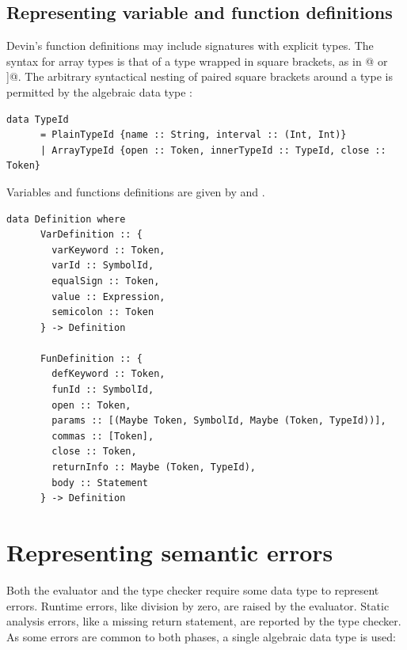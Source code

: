 \documentclass[UdineBachThesis,american,11pt]{PhdThesis}
\begin{document}
  \subsection{Representing variable and function definitions}

  Devin's function definitions may include signatures with explicit types. The
  syntax for array types is that of a type wrapped in square brackets, as in
  \lstinline@[Int]@ or \lstinline@[[Float]]@. The arbitrary syntactical nesting
  of paired square brackets around a type is permitted by the algebraic data
  type \lstinline@TypeId@:

  \begin{lstlisting}[gobble=4,basicstyle=\ttfamily\small]
    data TypeId
      = PlainTypeId {name :: String, interval :: (Int, Int)}
      | ArrayTypeId {open :: Token, innerTypeId :: TypeId, close :: Token}
  \end{lstlisting}

  Variables and functions definitions are given by \lstinline@VarDefinition@ and
  \lstinline@FunDefinition@.

  \begin{lstlisting}[gobble=4,basicstyle=\ttfamily\small]
    data Definition where
      VarDefinition :: {
        varKeyword :: Token,
        varId :: SymbolId,
        equalSign :: Token,
        value :: Expression,
        semicolon :: Token
      } -> Definition

      FunDefinition :: {
        defKeyword :: Token,
        funId :: SymbolId,
        open :: Token,
        params :: [(Maybe Token, SymbolId, Maybe (Token, TypeId))],
        commas :: [Token],
        close :: Token,
        returnInfo :: Maybe (Token, TypeId),
        body :: Statement
      } -> Definition
  \end{lstlisting}

  \newpage

  \section{Representing semantic errors}

  Both the evaluator and the type checker require some data type to represent
  errors. Runtime errors, like division by zero, are raised by the evaluator.
  Static analysis errors, like a missing return statement, are reported by the
  type checker. As some errors are common to both phases, a single algebraic
  data type is used:
\end{document}
